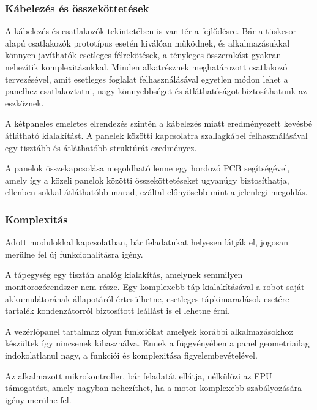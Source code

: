 \subsubsection{Kábelezés és összeköttetések}

A kábelezés és csatlakozók tekintetében is van tér a fejlődésre. Bár a tüskesor
alapú csatlakozók prototípus esetén kiválóan működnek, és alkalmazásukkal könnyen
javíthatók esetleges félrekötések, a tényleges összerakást gyakran nehezítik
komplexitásukkal. Minden alkatrésznek meghatározott csatlakozó tervezésével, amit
esetleges foglalat felhasználásával egyetlen módon lehet a panelhez
csatlakoztatni, nagy könnyebbséget és átláthatóságot biztosíthatunk az eszköznek.

\medskip

A kétpaneles emeletes elrendezés szintén a kábelezés miatt eredményezett kevésbé
átlátható kialakítást. A panelek közötti kapcsolatra szallagkábel
felhasználásával egy tisztább és átláthatóbb struktúrát eredményez.

\medskip

A panelok összekapcsolása megoldható lenne egy hordozó PCB
segítségével, amely így a közeli panelok közötti összeköttetéseket ugyanúgy
biztosíthatja, ellenben sokkal átláthatóbb marad, ezáltal előnyösebb mint a
jelenlegi megoldás.

\subsubsection{Komplexitás}

Adott modulokkal kapcsolatban, bár feladatukat helyesen látják el, jogosan
merülne fel új funkcionalitásra igény.

\medskip

A tápegység egy tisztán analóg kialakítás, amelynek semmilyen monitorozórendszer
nem része. Egy komplexebb táp kialakításával a robot saját akkumulátorának
állapotáról értesülhetne, esetleges tápkimaradások esetére tartalék
kondenzátorról biztosított leállást is el lehetne érni. 

\medskip

A vezérlőpanel tartalmaz olyan funkciókat amelyek korábbi alkalmazásokhoz
készültek így nincsenek kihasználva. Ennek a függvényében a panel geometriailag
indokolatlanul nagy, a funkciói és komplexitása figyelembevételével.

Az alkalmazott mikrokontroller, bár feladatát ellátja, nélkülözi az FPU
támogatást, amely nagyban nehezíthet, ha a motor komplexebb szabályozására igény
merülne fel.

